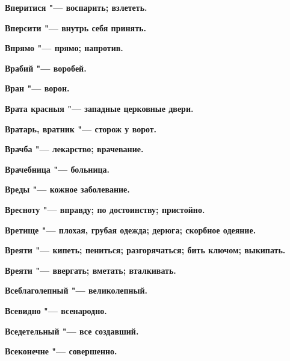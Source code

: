 \begin{mymulticols}{2}
\bfseries Вперитися\normalfont{} "--- воспарить; взлететь. 




\bfseries Вперсити\normalfont{} "--- внутрь себя принять. 




\bfseries Впрямо\normalfont{} "--- прямо; напротив. 




\bfseries Врабий\normalfont{} "--- воробей. 




\bfseries Вран\normalfont{} "--- ворон. 




\bfseries Врата красныя\normalfont{} "--- западные церковные двери. 




\bfseries Вратарь, вратник\normalfont{} "--- сторож у ворот. 




\bfseries Врачба\normalfont{} "--- лекарство; врачевание. 




\bfseries Врачебница\normalfont{} "--- больница. 




\bfseries Вреды\normalfont{} "--- кожное заболевание. 




\bfseries Вресноту\normalfont{} "--- вправду; по достоинству; пристойно. 




\bfseries Вретище\normalfont{} "--- плохая, грубая одежда; дерюга; скорбное одеяние. 




\bfseries Вреяти\normalfont{} "--- кипеть; пениться; разгорячаться; бить ключом; выкипать. 




\bfseries Вреяти\normalfont{} "--- ввергать; вметать; вталкивать. 




\bfseries Всеблаголепный\normalfont{} "--- великолепный. 




\bfseries Всевидно\normalfont{} "--- всенародно. 




\bfseries Вседетельный\normalfont{} "--- все создавший. 




\bfseries Всеконечне\normalfont{} "--- совершенно. 





\end{mymulticols}
